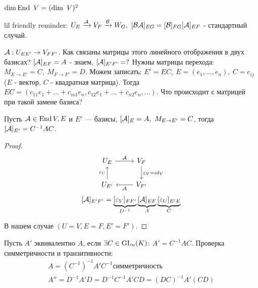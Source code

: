 \documentclass[main]{subfiles}
\begin{document}
\begin{corollary}
$\dim \operatorname{End}\ V = (\dim \ V)^2 $
\end{corollary}

lil friendly reminder: $U_E \xrightarrow{\mathcal{A}} V_F \xrightarrow{\mathcal{B}} W_G,\  
[\mathcal{B}\mathcal{A}]_{EG} = [\mathcal{B}]_{FG}[\mathcal{A}]_{EF}
$ - стандартный случай. 
    
$\mathcal{A}: U_{EE'} \rightarrow V_{FF'}$. Как связаны матрицы этого линейного отображения в двух базисах?
$[\mathcal{A}]_{EF}=A$ - знаем,  $[\mathcal{A}]_{E'F'}=?$ Нужны матрицы перехода:
$M_{E\rightarrow E'} = C,\ M_{F\rightarrow F'} = D$. Можем записать:
$E' = EC,\ E=(e_1, \ldots ,e_n),\ C=c_{ij}$ ($E$ - вектор, $C$ - квадратная матрица). Тогда
$EC=(c_{11}e_1+\ldots+c_{m1}e_n, c_{12}e_1 +\ldots +c_{n2}e_n, \ldots)$. Что происходит с матрицей при такой замене базиса?

\begin{proposition} 
    Пусть $\mathcal{A} \in \operatorname{End} V, E$ и $E'$ — базисы, $[\mathcal{A}]_{E}=A,\ M_{E\rightarrow E'}=C$, тогда $[\mathcal{A}]_{E'}=C^{-1}AC$.
\end{proposition}

\begin{proof}
        \[\begin{tikzcd}[ampersand replacement=\&]
            {U_E} \& {V_F} \\
            {U_{E'}} \& {V_{F'}}
            \arrow["{\epsilon_V=id_V}", from=1-2, to=2-2]
            \arrow["{\mca}", from=2-2, to=2-1]
            \arrow["{\epsilon_U}", from=2-1, to=1-1]
            \arrow["{\mca}", from=1-1, to=1-2]
        \end{tikzcd}\]
        \[[\mathcal{A}]_{E'F'}=\underbrace{[\varepsilon_V]_{FF'}}_{D^{-1}}\underbrace{[\mathcal{A}]_{EF}}_{A}\underbrace{[\varepsilon_U]_{E'E}}_{C}\]
    
    В нашем случае $(U=V, E=F, E'=F')$.
\end{proof}

\begin{definition} [Алгебра]
    Пусть $A'$ эквивалентно $A$, если $\exists C \in \operatorname{GL}_n(K)$: $A'=C^{-1}AC$. 
    Проверка симметричности и транзитивности:
    \begin{gather*} 
        A= (C^{-1})^{-1}A'C^{-1} симметричность \\
        A'' = D^{-1}A'D=D^{-1}C^{-1}A'CD=(DC)^{-1}A'(CD)  \\
    \end{gather*}
\end{definition}

 
\end{document}
